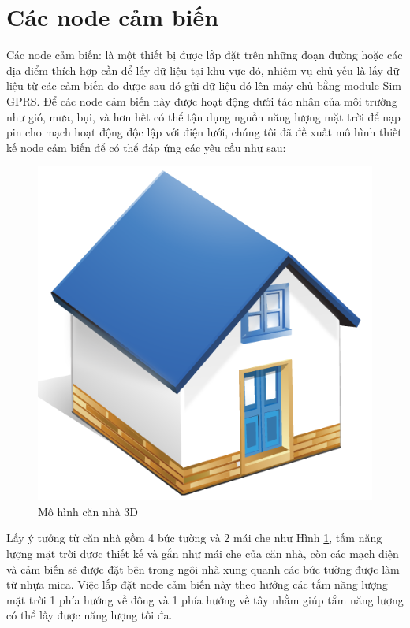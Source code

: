 \section{Các node cảm biến}\label{sec:cacloaicambien}
Các node cảm biến: là một thiết bị được lắp đặt trên những đoạn đường hoặc các địa điểm thích hợp cần để lấy dữ liệu tại khu vực đó, nhiệm vụ chủ yếu là lấy dữ liệu từ các cảm biến đo được sau đó gửi dữ liệu đó lên máy chủ bằng module Sim GPRS.
Để các node cảm biến này được hoạt động dưới tác nhân của môi trường như gió, mưa, bụi, và hơn hết có thể tận dụng nguồn năng lượng mặt trời để nạp pin cho mạch hoạt động độc lập với điện lưới, chúng tôi đã đề xuất mô hình thiết kế node cảm biến để có thể đáp ứng các yêu cầu như sau:
 \newpage
\begin{figure}
    \includegraphics[scale=0.3]{house_home}
    \caption[Mô hình căn nhà 3D]{Mô hình căn nhà 3D}
    \label{fig:house_home}
\end{figure}
Lấy ý tưởng từ căn nhà gồm 4 bức tường và 2 mái che như Hình \ref{fig:house_home}, tấm năng lượng mặt trời được thiết kế và gắn như mái che của căn nhà, còn các mạch điện và cảm biến sẽ được đặt bên trong ngôi nhà xung quanh các bức tường được làm từ nhựa mica. Việc lắp đặt node cảm biến này theo hướng các tắm năng lượng mặt trời 1 phía hướng về đông và 1 phía hướng về tây nhằm giúp tắm năng lượng có thể lấy được năng lượng tối đa.

